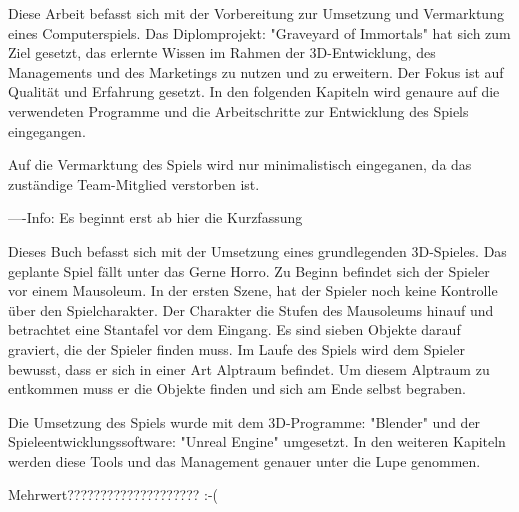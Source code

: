 Diese Arbeit befasst sich mit der Vorbereitung zur Umsetzung und Vermarktung eines Computerspiels.
Das Diplomprojekt: "Graveyard of Immortals" hat sich zum Ziel gesetzt, das erlernte Wissen im Rahmen der 3D-Entwicklung, des Managements und des Marketings zu nutzen und zu erweitern.
Der Fokus ist auf Qualität und Erfahrung gesetzt. In den folgenden Kapiteln wird genaure auf die verwendeten Programme und die Arbeitschritte zur Entwicklung des Spiels eingegangen.

Auf die Vermarktung des Spiels wird nur minimalistisch eingeganen, da das zuständige Team-Mitglied verstorben ist.

----Info: Es beginnt erst ab hier die Kurzfassung

Dieses Buch befasst sich mit der Umsetzung eines grundlegenden 3D-Spieles. Das geplante Spiel fällt unter das Gerne Horro.
Zu Beginn befindet sich der Spieler vor einem Mausoleum. In der ersten Szene, hat der Spieler noch keine Kontrolle über den Spielcharakter.
Der Charakter die Stufen des Mausoleums hinauf und betrachtet eine Stantafel vor dem Eingang. Es sind sieben Objekte darauf graviert, die der Spieler finden muss.
Im Laufe des Spiels wird dem Spieler bewusst, dass er sich in einer Art Alptraum befindet. Um diesem Alptraum zu entkommen muss er die Objekte finden und sich am Ende selbst begraben.

Die Umsetzung des Spiels wurde mit dem 3D-Programme: "Blender" und der Spieleentwicklungssoftware: "Unreal Engine" umgesetzt.
In den weiteren Kapiteln werden diese Tools und das Management genauer unter die Lupe genommen.

\todo Mehrwert???????????????????? :-(
